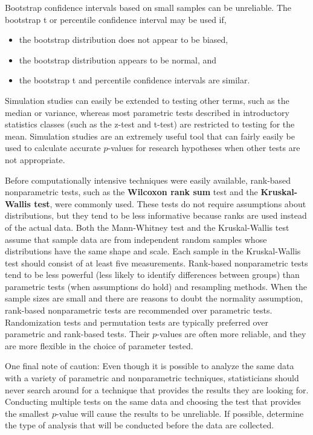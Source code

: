 \documentclass[
]{book}
\providecommand{\tightlist}{%
  \setlength{\itemsep}{0pt}\setlength{\parskip}{0pt}}
\begin{document}
Bootstrap confidence intervals based on small samples can be unreliable. The bootstrap t or percentile confidence interval may be used if,

\begin{itemize}
\tightlist
\item
  the bootstrap distribution does not appear to be biased,
\item
  the bootstrap distribution appears to be normal, and
\item
  the bootstrap t and percentile confidence intervals are similar.
\end{itemize}

Simulation studies can easily be extended to testing other terms, such as the median or variance, whereas most parametric tests described in introductory statistics classes (such as the z-test and t-test) are restricted to testing for the mean. Simulation studies are an extremely useful tool that can fairly easily be used to calculate accurate \(p\)-values for research hypotheses when other tests are not appropriate.

Before computationally intensive techniques were easily available, rank-based nonparametric tests, such as the \textbf{Wilcoxon rank sum} test and the \textbf{Kruskal-Wallis test}, were commonly used. These tests do not require assumptions about distributions, but they tend to be less informative because ranks are used instead of the actual data. Both the Mann-Whitney test and the Kruskal-Wallis test assume that sample data are from independent random samples whose distributions have the same shape and scale. Each sample in the Kruskal-Wallis test should consist of at least five measurements. Rank-based nonparametric tests tend to be
less powerful (less likely to identify differences between groups) than parametric tests (when assumptions do hold) and resampling methods. When the sample sizes are small and there are reasons to doubt the normality assumption, rank-based nonparametric tests are recommended over parametric tests. Randomization tests and
permutation tests are typically preferred over parametric and rank-based tests. Their \(p\)-values are often more reliable, and they are more flexible in the choice of parameter tested.

One final note of caution: Even though it is possible to analyze the same data with a variety of parametric and nonparametric techniques, statisticians should never search around for a technique that provides the results they are looking for. Conducting multiple tests on the same data and choosing the test that provides the smallest \(p\)-value will cause the results to be unreliable. If possible, determine the type of analysis that will be conducted before the data are collected.
\end{document}
